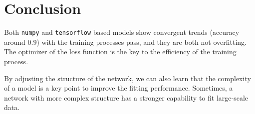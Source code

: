 \documentclass[10pt]{article}
\begin{document}
\section{Conclusion}
Both \texttt{numpy} and \texttt{tensorflow} based models show convergent trends (accuracy around $0.9$) with the training processes pass, and they are both not overfitting. The optimizer of the loss function is the key to the efficiency of the training process.\par
By adjusting the structure of the network, we can also learn that the complexity of a model is a key point to improve the fitting performance. Sometimes, a network with more complex structure has a stronger capability to fit large-scale data.


\end{document}

